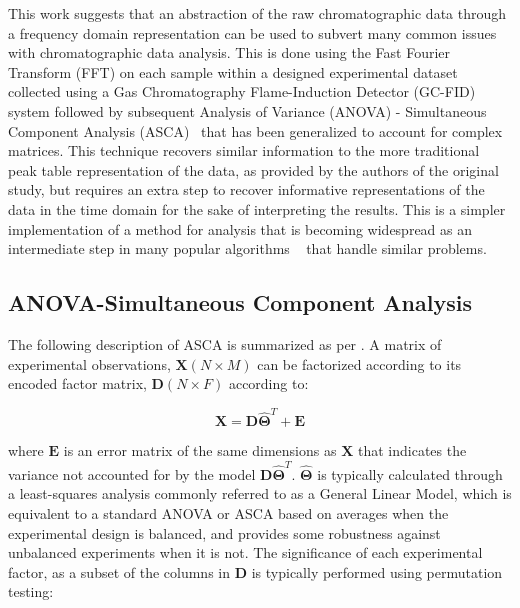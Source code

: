 \documentclass[preprint,12pt]{elsarticle}
\begin{document}
This work suggests that an abstraction of the raw chromatographic data through a frequency domain representation can be used to subvert many common issues with chromatographic data analysis. This is done using the Fast Fourier Transform (FFT) on each sample within a designed experimental dataset collected using a Gas Chromatography Flame-Induction Detector (GC-FID) system followed by subsequent Analysis of Variance (ANOVA) - Simultaneous Component Analysis (ASCA)~\cite{smilde2005anova} that has been generalized to account for complex matrices. This technique recovers similar information to the more traditional peak table representation of the data, as provided by the authors of the original study, but requires an extra step to recover informative representations of the data in the time domain for the sake of interpreting the results. This is a simpler implementation of a method for analysis that is becoming widespread as an intermediate step in many popular algorithms ~\cite{schneide2023shift,schneide2024shift,yu2023parasias} that handle similar problems.


\subsection{ANOVA-Simultaneous Component Analysis}

The following description of ASCA is summarized as per \cite{camacho2023permutation}. A matrix of experimental observations, $\mathbf{X} (N \times M)$ can be factorized according to its encoded factor matrix, $\mathbf{D} (N \times F)$ according to:

\begin{equation}
    \mathbf{X} = \mathbf{D} \mathbf{\hat{\Theta}}^T + \mathbf{E}
\end{equation}

\noindent where $\mathbf{E}$ is an error matrix of the same dimensions as $\mathbf{X}$ that indicates the variance not accounted for by the model $\mathbf{D} \mathbf{\hat{\Theta}}^T$. $\mathbf{\hat{\Theta}}$ is typically calculated through a least-squares analysis commonly referred to as a General Linear Model, which is equivalent to a standard ANOVA or ASCA based on averages \cite{smilde2005anova} when the experimental design is balanced, and provides some robustness against unbalanced experiments when it is not. The significance of each experimental factor, as a subset of the columns in $\mathbf{D}$ is typically performed using permutation testing:
\end{document}
